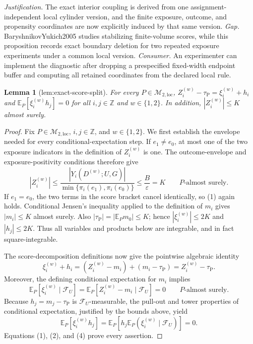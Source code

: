 \documentclass{article}
\newtheorem{lemma}{Lemma}
\begin{document}
\par\smallskip\noindent \textit{Justification.} The exact interior coupling is derived from one assignment-independent local cylinder version, and the finite exposure, outcome, and propensity coordinates are now explicitly induced by that same version. \textit{Gap.} BaryshnikovYukich2005 studies stabilizing finite-volume scores, while this proposition records exact boundary deletion for two repeated exposure experiments under a common local version. \textit{Consumer.} An experimenter can implement the diagnostic after dropping a prespecified fixed-width endpoint buffer and computing all retained coordinates from the declared local rule.

\begin{lemma}[lem:exact-score-split]\label{lem:exact-score-split}
For every \(P\in\mathcal M_{2,\mathrm{loc}}\), \(Z_i^{(w)}-\tau_{\mathrm P}=\xi_i^{(w)}+h_i\) and \(\mathbb E_P[\xi_i^{(w)}h_j]=0\) for all \(i,j\in\mathbb Z\) and \(w\in\{1,2\}\). In addition, \(|Z_i^{(w)}|\le K\) almost surely.
\end{lemma}
\begin{proof}
Fix \(P\in\mathcal M_{2,\mathrm{loc}}\), \(i,j\in\mathbb Z\), and \(w\in\{1,2\}\).  We first establish the envelope needed for every conditional-expectation step.  If \(e_1\ne e_0\), at most one of the two exposure indicators in the definition of \(Z_i^{(w)}\) is one.  The outcome-envelope and exposure-positivity conditions therefore give
\[
 |Z_i^{(w)}|
 \le
 \frac{|Y_i(D^{(w)};U,G)|}
      {\min\{\pi_i(e_1),\pi_i(e_0)\}}
 \le \frac B\varepsilon=K
 \qquad P\text{-almost surely}. \tag{1}
\]
If \(e_1=e_0\), the two terms in the score bracket cancel identically, so (1) again holds.  Conditional Jensen's inequality applied to the definition of \(m_i\) gives \(|m_i|\le K\) almost surely.  Also \(|\tau_{\mathrm P}|=|\mathbb E_Pm_0|\le K\); hence \(|\xi_i^{(w)}|\le2K\) and \(|h_j|\le2K\).  Thus all variables and products below are integrable, and in fact square-integrable.

The score-decomposition definitions now give the pointwise algebraic identity
\[
 \xi_i^{(w)}+h_i
 =(Z_i^{(w)}-m_i)+(m_i-\tau_{\mathrm P})
 =Z_i^{(w)}-\tau_{\mathrm P}. \tag{2}
\]
Moreover, the defining conditional expectation for \(m_i\) implies
\[
 \mathbb E_P[\xi_i^{(w)}\mid\mathcal F_U]
 =\mathbb E_P[Z_i^{(w)}-m_i\mid\mathcal F_U]=0
 \qquad P\text{-almost surely}. \tag{3}
\]
Because \(h_j=m_j-\tau_{\mathrm P}\) is \(\mathcal F_U\)-measurable, the pull-out and tower properties of conditional expectation, justified by the bounds above, yield
\[
 \mathbb E_P[\xi_i^{(w)}h_j]
 =\mathbb E_P\!\left[
   h_j\mathbb E_P(\xi_i^{(w)}\mid\mathcal F_U)
 \right]
 =0. \tag{4}
\]
Equations (1), (2), and (4) prove every assertion.
\end{proof}
\end{document}
